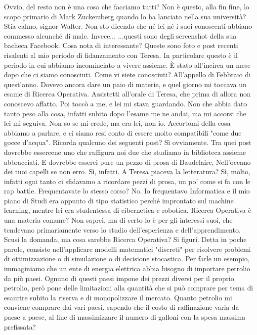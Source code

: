 \documentclass[a4paper,12pt]{article}
\newcommand{\Walter}{\speak{W}}
\newcommand{\Pollazzi}{\speak{P}}
\begin{document}
\begin{dialogue}
\Walter  Ovvio, del resto non è una cosa che facciamo tutti? Non è questo, alla fin fine, lo scopo primario di Mark Zuckemberg quando lo ha lanciato nella sua università?
\Pollazzi  Stia calmo, signor Walter. Non sto dicendo che né lei né i suoi conoscenti abbiano commesso alcunché di male. Invece...  ...questi sono degli screenshot della sua bacheca Facebook. Cosa nota di interessante?
\Walter  Queste sono foto e post recenti risalenti al mio periodo di fidanzamento con Teresa. In particolare  questo è il periodo in cui abbiamo incominciato a vivere assieme. È stato all'incirca un mese dopo che ci siamo conosciuti.
\Pollazzi  Come vi siete conosciuti?
\Walter  All'appello di Febbraio di quest'anno. Dovevo ancora dare un paio di materie, e quel giorno mi toccava un esame di Ricerca Operativa. Assistetti all'orale di Teresa, che prima di allora non conoscevo affatto. Poi toccò a me, e lei mi stava guardando. Non che abbia dato tanto peso alla cosa, infatti subito dopo l'esame me ne andai, ma mi accorsi che lei mi seguiva. Non so se mi crede, ma era lei, non io. Accortomi della cosa abbiamo a parlare, e ci siamo resi conto di essere molto compatibili "come due gocce d'acqua".
\Pollazzi  {} Ricorda qualcuno dei seguenti post?
\Walter  Sì ovviamente. Tra quei post dovrebbe essercene uno che raffigura noi due che studiamo in biblioteca assieme abbracciati. E dovrebbe esserci pure un pezzo di prosa di Baudelaire, Nell'oceano dei tuoi capelli se non erro.
\Pollazzi  {} Sì, infatti. A Teresa piaceva la letteratura?
\Walter  Sì, molto, infatti ogni tanto ci sfidavamo a ricordare pezzi di prosa, un po' come si fa con le rap battle.
\Pollazzi  Frequentavate lo stesso corso?
\Walter  No. Io frequentavo Informatica e il mio piano di Studi era appunto di tipo statistico perché improntato sul machine learning, mentre lei era studentessa di cibernetica e robotica.
\Pollazzi  Ricerca Operativa è una materia comune?
\Walter  Non saprei, ma di certo lo è per gli interessi suoi, che tendevano primariamente verso lo studio dell'esperienza e dell'apprendimento.
\Pollazzi  Scusi la domanda, ma cosa sarebbe Ricerca Operativa?
\Walter  Si figuri. Detta in poche parole, consiste nell'applicare modelli matematici "discreti" per risolvere problemi di ottimizzazione o di simulazione o di decisione stocastica. Per farle un esempio, immaginiamo che un ente di energia elettrica abbia bisogno di importare petrolio da più paesi. Ognuno di questi paesi impone dei prezzi diversi per il proprio petrolio, però pone delle limitazioni alla quantità che si può comprare per tema di esaurire subito la riserva e di monopolizzare il mercato. Quanto petrolio mi conviene comprare dai vari paesi, sapendo che il costo di raffinazione varia da paese a paese, al fine di massimizzare il numero di galloni con la spesa massima prefissata?

\end{dialogue}
\end{document}
